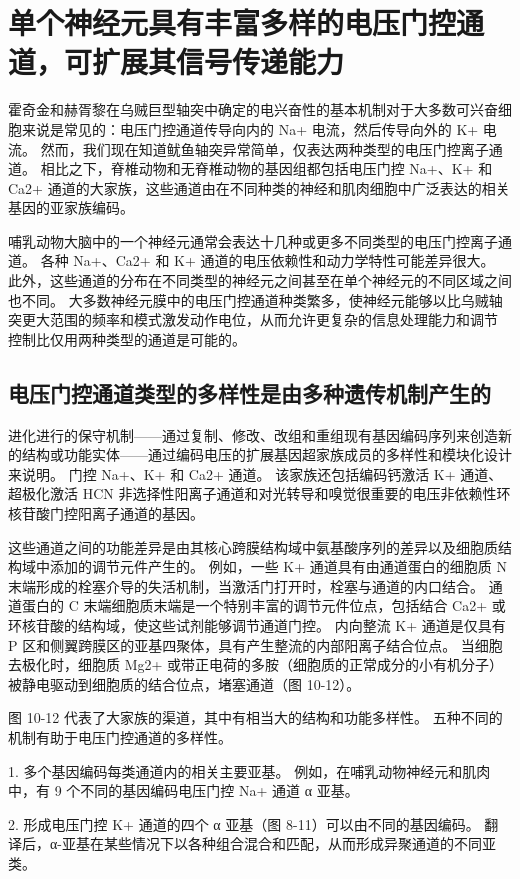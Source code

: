 \section{单个神经元具有丰富多样的电压门控通道，可扩展其信号传递能力}

霍奇金和赫胥黎在乌贼巨型轴突中确定的电兴奋性的基本机制对于大多数可兴奋细胞来说是常见的：电压门控通道传导向内的 Na+ 电流，然后传导向外的 K+ 电流。 然而，我们现在知道鱿鱼轴突异常简单，仅表达两种类型的电压门控离子通道。 相比之下，脊椎动物和无脊椎动物的基因组都包括电压门控 Na+、K+ 和 Ca2+ 通道的大家族，这些通道由在不同种类的神经和肌肉细胞中广泛表达的相关基因的亚家族编码。

哺乳动物大脑中的一个神经元通常会表达十几种或更多不同类型的电压门控离子通道。 各种 Na+、Ca2+ 和 K+ 通道的电压依赖性和动力学特性可能差异很大。 此外，这些通道的分布在不同类型的神经元之间甚至在单个神经元的不同区域之间也不同。 大多数神经元膜中的电压门控通道种类繁多，使神经元能够以比乌贼轴突更大范围的频率和模式激发动作电位，从而允许更复杂的信息处理能力和调节 控制比仅用两种类型的通道是可能的。


\subsection{电压门控通道类型的多样性是由多种遗传机制产生的}
进化进行的保守机制——通过复制、修改、改组和重组现有基因编码序列来创造新的结构或功能实体——通过编码电压的扩展基因超家族成员的多样性和模块化设计来说明。 门控 Na+、K+ 和 Ca2+ 通道。 该家族还包括编码钙激活 K+ 通道、超极化激活 HCN 非选择性阳离子通道和对光转导和嗅觉很重要的电压非依赖性环核苷酸门控阳离子通道的基因。

这些通道之间的功能差异是由其核心跨膜结构域中氨基酸序列的差异以及细胞质结构域中添加的调节元件产生的。 例如，一些 K+ 通道具有由通道蛋白的细胞质 N 末端形成的栓塞介导的失活机制，当激活门打开时，栓塞与通道的内口结合。 通道蛋白的 C 末端细胞质末端是一个特别丰富的调节元件位点，包括结合 Ca2+ 或环核苷酸的结构域，使这些试剂能够调节通道门控。 内向整流 K+ 通道是仅具有 P 区和侧翼跨膜区的亚基四聚体，具有产生整流的内部阳离子结合位点。 当细胞去极化时，细胞质 Mg2+ 或带正电荷的多胺（细胞质的正常成分的小有机分子）被静电驱动到细胞质的结合位点，堵塞通道（图 10-12）。

图 10-12 代表了大家族的渠道，其中有相当大的结构和功能多样性。 五种不同的机制有助于电压门控通道的多样性。

1. 多个基因编码每类通道内的相关主要亚基。 例如，在哺乳动物神经元和肌肉中，有 9 个不同的基因编码电压门控 Na+ 通道 α 亚基。

2. 形成电压门控 K+ 通道的四个 α 亚基（图 8-11）可以由不同的基因编码。 翻译后，α-亚基在某些情况下以各种组合混合和匹配，从而形成异聚通道的不同亚类。 

